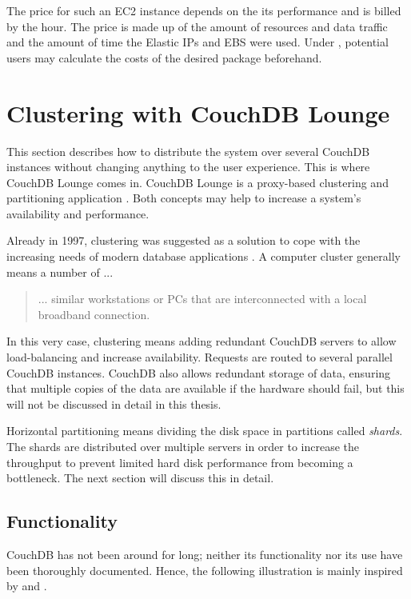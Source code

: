 The price for such an EC2 instance depends on the its performance and is billed by the hour. The price is made up of the amount of resources and data traffic and the amount of time the Elastic IPs and EBS were used. Under \cite{aws:preistabelle}, potential users may calculate the costs of the desired package beforehand.



\section{Clustering with CouchDB Lounge}
\label{subsec:lounge}

This section describes how to distribute the system over several CouchDB instances without changing anything to the user experience. This is where CouchDB Lounge \cite{lounge:website} comes in. CouchDB Lounge is a proxy-based clustering and partitioning application \cite{lounge:SOC}. Both concepts may help to increase a system's availability and performance.

Already in 1997, clustering was suggested as a solution to cope with the increasing needs of modern database applications . A computer cluster generally means a number of ...

\begin{quote}
... similar workstations or PCs that are interconnected with a local broadband connection. 
\end{quote}

In this very case, clustering means adding redundant CouchDB servers to allow load-balancing and increase availability. Requests are routed to several parallel CouchDB instances. CouchDB also allows redundant storage of data, ensuring that multiple copies of the data are available if the hardware should fail, but this will not be discussed in detail in this thesis.

Horizontal partitioning means dividing the disk space in partitions called \textit{shards}. The shards are distributed over multiple servers in order to increase the throughput to prevent limited hard disk performance from becoming a bottleneck. The next section will discuss this in detail.

\subsection{Functionality}

CouchDB has not been around for long; neither its functionality nor its use have been thoroughly documented. Hence, the following illustration is mainly inspired by  and \cite{lounge:wiki}.

